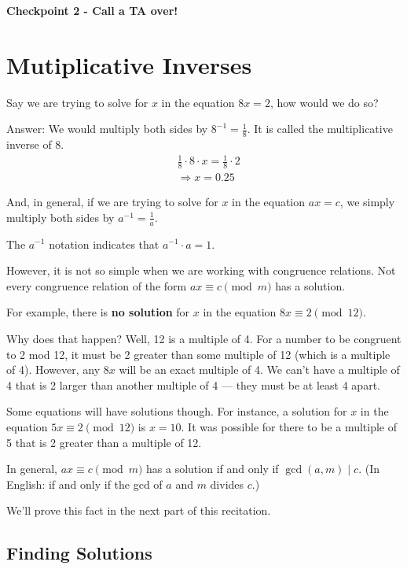 \documentclass[12pt,letterpaper]{article}
\begin{document}
    \textbf{Checkpoint 2 - Call a TA over!}
    
    \pagebreak
	\section*{Mutiplicative Inverses}

	Say we are trying to solve for $x$ in the equation $8x = 2$, how would we do so?

	Answer: We would multiply both sides by $8^{-1} = \frac{1}{8}$. It is called the multiplicative inverse of 8.
	\begin{align*}
		&\frac{1}{8}\cdot 8 \cdot x  = \frac{1}{8} \cdot 2 \\
		&\Rightarrow x = 0.25
	\end{align*}	

	And, in general, if we are trying to solve for $x$ in the equation $ax = c$, we simply multiply both sides by $a^{-1} = \frac{1}{a}$. 

	The $a^{-1}$ notation indicates that $a^{-1}\cdot a = 1$. 

	However, it is not so simple when we are working with congruence relations. Not every congruence relation of the form $ax \equiv c \pmod{m}$ has a solution.

	For example, there is \textbf{no solution} for $x$ in the equation $8x \equiv 2 \pmod{12}$.
	
	Why does that happen? Well, 12 is a multiple of 4. For a number to be congruent to 2 mod 12, it must be 2 greater than some multiple of 12 (which is a multiple of 4). However, any $8x$ will be an exact multiple of 4. We can't have a multiple of 4 that is 2 larger than another multiple of 4 — they must be at least 4 apart.
	
	Some equations will have solutions though. For instance, a solution for $x$ in the equation $5x \equiv 2 \pmod{12}$ is $x=10$. It was possible for there to be a multiple of 5 that is 2 greater than a multiple of 12.
	
	In general, $ax \equiv c \pmod{m}$ has a solution if and only if $\gcd(a,m) \mid c$. (In English: if and only if the gcd of $a$ and $m$ divides $c$.)
	
	We'll prove this fact in the next part of this recitation.
    
    \pagebreak

	\subsection*{Finding Solutions}
\end{document}
